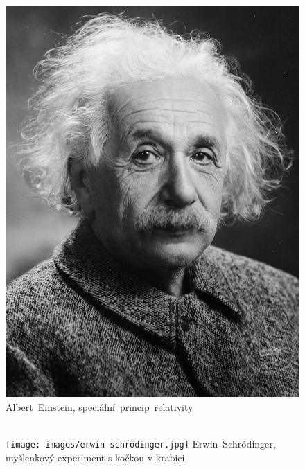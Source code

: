 \documentclass{../../../../style/mkimain}
\begin{document}
\begin{figure}[H]
  \begin{center}
    \includegraphics[width=0.8\linewidth]{images/albert-einstein.jpeg}
      Albert~Einstein, speciální~princip~relativity\\\ \\
      \end{center}
  \endminipage\hfill
  \begin{center}
    \texttt{[image: images/erwin-schrödinger.jpg]}
        Erwin~Schrödinger, myšlenkový experiment s kočkou v krabici
      \end{center}
  \endminipage\hfill
  \begin{center}

\end{center}
\end{figure}
\end{document}
